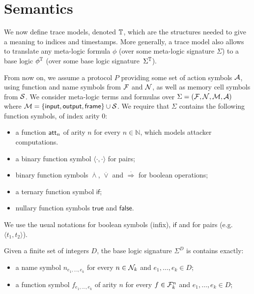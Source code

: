 \section{Semantics}

We now define trace models, denoted $\mathbb{T}$, which are the structures needed to
give a meaning to indices and timestamps. More generally, a trace model
also allows to translate any meta-logic formula $\phi$
(over some meta-logic signature $\Sigma$)
to a base logic $\phi^{\mathbb{T}}$ (over some base logic signature~$\Sigma^{\mathbb{T}}$).

\medskip

From now on, we assume a protocol $P$ providing some set of action
symbols $\mathcal{A}$, using function and name symbols from $\mathcal{F}$ and $\mathcal{N}$,
as well as memory cell symbols from $\mathcal{S}$.
We consider meta-logic terms and formulas over $\Sigma = (\mathcal{F},\mathcal{N},\mathcal{M},\mathcal{A})$
where $\mathcal{M} = \{ \textsf{input}, \textsf{output}, \textsf{frame} \} \cup \mathcal{S}$. We require that $\Sigma$ contains the following function symbols, of index arity $0$:
\begin{itemize}
\item a function $\mathsf{att}_n$ of arity $n$ for every $n\in\mathbb{N}$, which models attacker computations. 
\item a binary function symbol $\langle \cdot , \cdot \rangle$ for pairs;
\item binary function symbols
  $\stackrel{.}{\wedge}$, $\stackrel{.}{\vee}$ and
  $\stackrel{.}{\Rightarrow}$ for boolean operations;
\item a ternary function symbol $\mathsf{if}$;
\item nullary function symbols $\mathsf{true}$ and $\mathsf{false}$.
\end{itemize}
We use the usual notations for boolean symbols (infix), $\mathsf{if}$ and for pairs (e.g.\ $\langle t_1,t_2 \rangle$).

\begin{definition}
  Given a finite set of integers $D$, the base logic
  signature $\Sigma^D$ is contains exactly:
  \begin{itemize}
    \item a name symbol $n_{e_1,\ldots,e_k}$ for every $n \in \mathcal{N}_k$
       and $e_1,\ldots,e_k \in D$;
    \item a function symbol $f_{e_1,\ldots,e_k}$ of arity $n$ for every
      $f \in \mathcal{F}_k^n$ and $e_1,\ldots,e_k \in D$;
  \end{itemize}
\end{definition}

